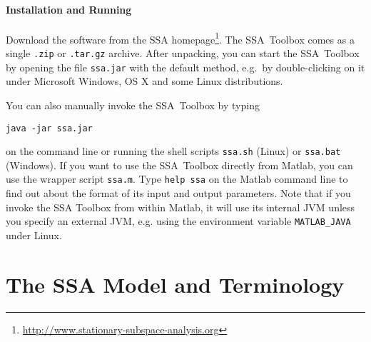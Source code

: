 \documentclass{article}
\newcommand{\1}{\ensuremath{\mathds{1}}}
\newcommand{\0}{\ensuremath{0}}
\begin{document}
\paragraph{Installation and Running}

Download the software from the SSA homepage\footnote{\url{http://www.stationary-subspace-analysis.org}}. 
The SSA~Toolbox comes as a single \texttt{.zip} or \texttt{.tar.gz} archive. 
After unpacking, you can start the SSA~Toolbox by opening the file \texttt{ssa.jar}
with the default method, e.g.~by double-clicking on it under Microsoft Windows, 
OS X and some Linux distributions.

You can also manually invoke the SSA~Toolbox by typing
\begin{center}
  \texttt{java -jar ssa.jar}
\end{center}
on the command line or running the shell scripts \texttt{ssa.sh} (Linux)
or \texttt{ssa.bat} (Windows). If you want to use the SSA~Toolbox directly from Matlab, 
you can use the wrapper script \texttt{ssa.m}. Type \texttt{help ssa} on the Matlab 
command line to find out about the format of its input and output parameters. 
Note that if you invoke the SSA Toolbox from within Matlab, it will use its
internal JVM unless you specify an external JVM, e.g. using the environment
variable \texttt{MATLAB\_JAVA} under Linux.

\section{The SSA Model and Terminology}
\end{document}
